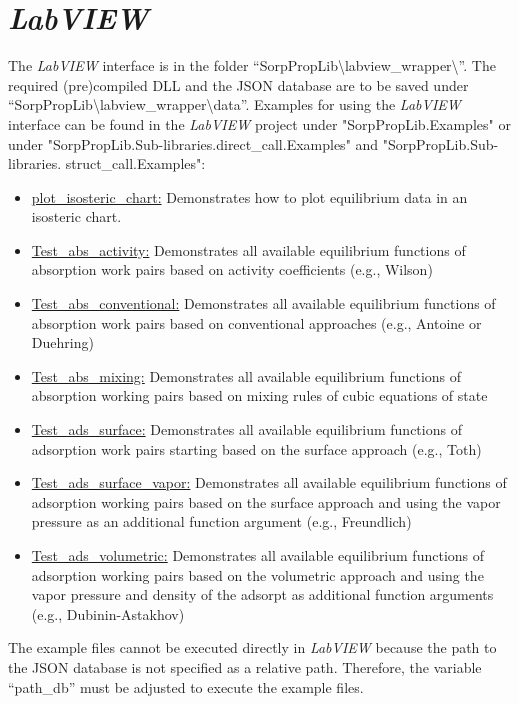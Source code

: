 \section{\textit{LabVIEW}}
\label{cha:usage:labview}
%
The \textit{LabVIEW} interface is in the folder “SorpPropLib\textbackslash labview\_wrapper\textbackslash ”. The required (pre)compiled DLL and the JSON database are to be saved under “SorpPropLib\textbackslash labview\_wrapper\textbackslash data”. Examples for using the \textit{LabVIEW} interface can be found in the \textit{LabVIEW} project under "SorpPropLib.Examples" or under "SorpPropLib.Sub-libraries.direct\_call.Examples" and "SorpPropLib.Sub-libraries. struct\_call.Examples":
\begin{itemize}
	\item \underline{plot\_isosteric\_chart:} Demonstrates how to plot equilibrium data in an isosteric chart.
	\item \underline{Test\_abs\_activity:} Demonstrates all available equilibrium functions of absorption work pairs based on activity coefficients (e.g., Wilson)
	\item \underline{Test\_abs\_conventional:} Demonstrates all available equilibrium functions of absorption work pairs based on conventional approaches (e.g., Antoine or Duehring)
	\item \underline{Test\_abs\_mixing:} Demonstrates all available equilibrium functions of absorption working pairs based on mixing rules of cubic equations of state
	\item \underline{Test\_ads\_surface:} Demonstrates all available equilibrium functions of adsorption work pairs starting based on the surface approach (e.g., Toth)
	\item \underline{Test\_ads\_surface\_vapor:} Demonstrates all available equilibrium functions of adsorption working pairs based on the surface approach and using the vapor pressure as an additional function argument (e.g., Freundlich)
	\item \underline{Test\_ads\_volumetric:} Demonstrates all available equilibrium functions of adsorption working pairs based on the volumetric approach and using the vapor pressure and density of the adsorpt as additional function arguments (e.g., Dubinin-Astakhov)
\end{itemize}
The example files cannot be executed directly in \textit{LabVIEW} because the path to the JSON database is not specified as a relative path. Therefore, the variable “path\_db” must be adjusted to execute the example files.
